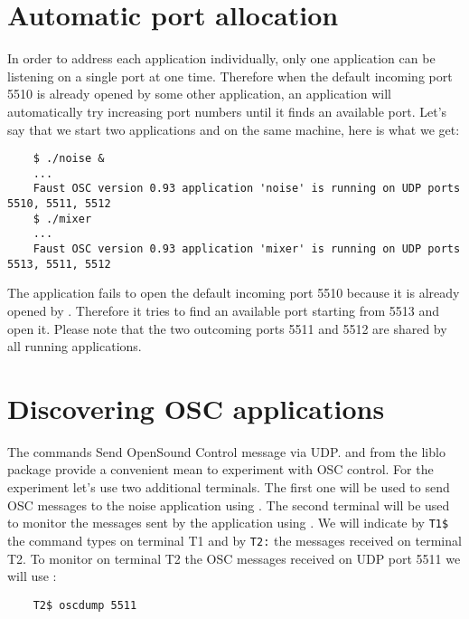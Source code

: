 \section{Automatic port allocation}
In order to address each application individually, only one application can be listening on a single port at one time. Therefore when the default incoming port 5510 is already opened by some other application, an application will automatically try increasing port numbers until it finds an available port. Let's say that we start two applications  and  on the same machine, here is what we get:
\begin{lstlisting}
	$ ./noise &
	...
	Faust OSC version 0.93 application 'noise' is running on UDP ports 5510, 5511, 5512
	$ ./mixer
	...
	Faust OSC version 0.93 application 'mixer' is running on UDP ports 5513, 5511, 5512
\end{lstlisting}
The  application fails to open the default incoming port 5510 because it is already opened by . Therefore it tries to find an available port starting from 5513 and open it. Please note that the two outcoming ports 5511 and 5512 are shared by all running applications.

\section{Discovering OSC applications}

The commands 
Send OpenSound Control message via UDP. and  from the liblo package provide a convenient mean to experiment with OSC control. For the experiment let's use two additional terminals. The first one will be used to send OSC messages to the noise application using . The second terminal will be used to monitor the messages sent by the application using . We will indicate by \lstinline'T1$' the command types on terminal T1 and by \lstinline'T2:' the messages received on terminal T2. To monitor on terminal T2 the OSC messages received on UDP port 5511 we will use :
\begin{lstlisting}
	T2$ oscdump 5511
\end{lstlisting}


